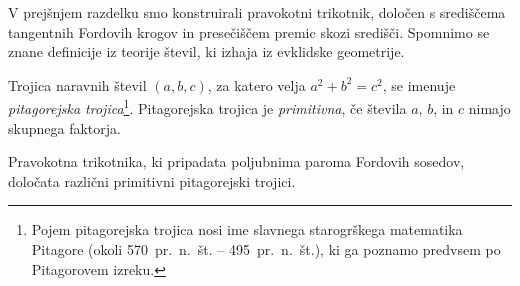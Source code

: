 \documentclass[mat1]{fmfdelo}
\begin{document}
%
V prejšnjem razdelku smo konstruirali pravokotni trikotnik, določen s središčema tangentnih Fordovih krogov in presečiščem premic skozi središči. Spomnimo se znane definicije iz teorije števil, ki izhaja iz evklidske geometrije. 

\begin{definicija}
Trojica naravnih števil $(a,b,c)$, za katero velja $a^2+b^2=c^2$, se imenuje \emph{pitagorejska trojica}\footnote{Pojem pitagorejska trojica nosi ime slavnega starogrškega matematika Pitagore (okoli 570~pr.~n.~št. -- 495~pr.~n.~št.), ki ga poznamo predvsem po Pitagorovem izreku.}.
Pitagorejska trojica je \emph{primitivna}, če števila $a$, $b$, in $c$ nimajo skupnega faktorja.
\end{definicija}

\begin{trditev}
Pravokotna trikotnika, ki pripadata poljubnima paroma Fordovih sosedov, določata različni primitivni pitagorejski trojici.
\end{trditev}
\end{document}
